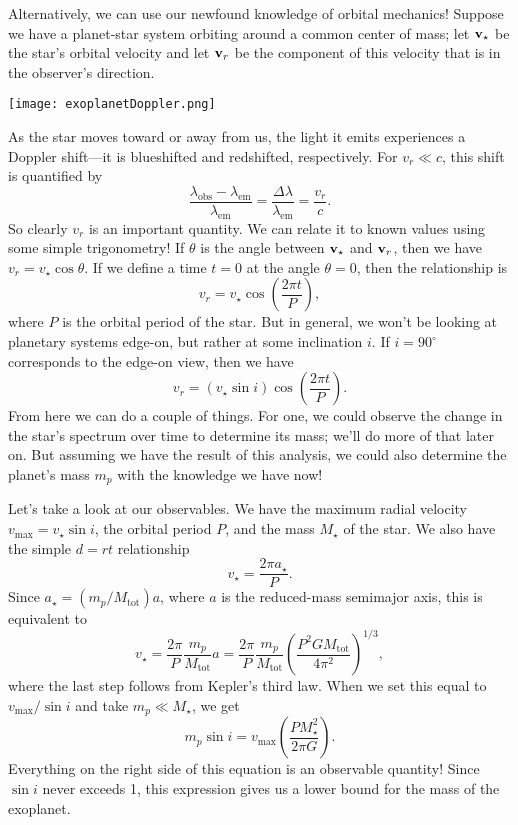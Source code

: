 \documentclass[../a062main.tex]{subfiles}
\begin{document}
Alternatively, we can use our newfound knowledge of orbital mechanics!
Suppose we have a planet-star system orbiting around a common center of mass; let $\mathbf{v}_\star$ be the star's orbital velocity and let $\mathbf{v}_r$ be the component of this velocity that is in the observer's direction.
\begin{center}
    \texttt{[image: exoplanetDoppler.png]}
\end{center}
As the star moves toward or away from us, the light it emits experiences a Doppler shift---it is blueshifted and redshifted, respectively.
For $v_r \ll c$, this shift is quantified by
\[ \frac{\lambda_\textrm{obs} - \lambda_\textrm{em}}{\lambda_\textrm{em}} = \frac{\Delta \lambda}{\lambda_\textrm{em}} = \frac{v_r}{c}. \]
So clearly $v_r$ is an important quantity.
We can relate it to known values using some simple trigonometry!
If $\theta$ is the angle between $\mathbf{v}_\star$ and $\mathbf{v}_r$, then we have $v_r = v_\star \cos \theta$.
If we define a time $t=0$ at the angle $\theta=0$, then the relationship is
\[ v_r = v_\star \cos \left( \frac{2\pi t}{P} \right), \]
where $P$ is the orbital period of the star.
But in general, we won't be looking at planetary systems edge-on, but rather at some inclination $i$.
If $i=90^\circ$ corresponds to the edge-on view, then we have
\[ \boxed{v_r = (v_\star \sin i) \cos \left( \frac{2\pi t}{P} \right)}. \]
From here we can do a couple of things.
For one, we could observe the change in the star's spectrum over time to determine its mass; we'll do more of that later on.
But assuming we have the result of this analysis, we could also determine the planet's mass $m_p$ with the knowledge we have now!

Let's take a look at our observables.
We have the maximum radial velocity $v_\textrm{max} = v_\star \sin i$, the orbital period $P$, and the mass $M_\star$ of the star.
We also have the simple $d = rt$ relationship
\[ v_\star = \frac{2 \pi a_\star}{P}. \]
Since $a_\star = (m_p / M_\textrm{tot}) a$, where $a$ is the reduced-mass semimajor axis, this is equivalent to
\[ v_\star = \frac{2\pi}{P} \frac{m_p}{M_\textrm{tot}} a = \frac{2\pi}{P} \frac{m_p}{M_\textrm{tot}} \left( \frac{P^2 GM_\textrm{tot}}{4 \pi^2} \right)^{1/3}, \]
where the last step follows from Kepler's third law.
When we set this equal to $v_\textrm{max} / \sin i$ and take $m_p \ll M_\star$, we get
\[ \boxed{m_p \sin i = v_\textrm{max} \left( \frac{PM_\star^2}{2\pi G} \right)}. \]
Everything on the right side of this equation is an observable quantity!
Since $\sin i$ never exceeds 1, this expression gives us a lower bound for the mass of the exoplanet.
\end{document}

